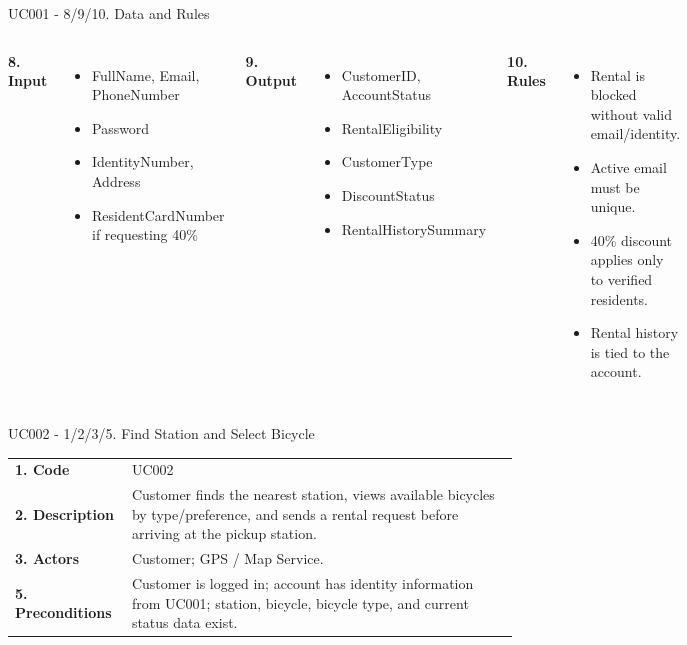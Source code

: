 \documentclass[aspectratio=169,10pt]{beamer}
\newcommand{\tightitems}{\setlength{\itemsep}{2pt}\setlength{\parskip}{0pt}}
\begin{document}
\begin{frame}{UC001 - 8/9/10. Data and Rules}
\footnotesize
\begin{columns}[T,onlytextwidth]
\textbf{8. Input}
\begin{itemize}\tightitems
  \item FullName, Email, PhoneNumber
  \item Password
  \item IdentityNumber, Address
  \item ResidentCardNumber if requesting 40\%
\end{itemize}
\textbf{9. Output}
\begin{itemize}\tightitems
  \item CustomerID, AccountStatus
  \item RentalEligibility
  \item CustomerType
  \item DiscountStatus
  \item RentalHistorySummary
\end{itemize}
\textbf{10. Rules}
\begin{itemize}\tightitems
  \item Rental is blocked without valid email/identity.
  \item Active email must be unique.
  \item 40\% discount applies only to verified residents.
  \item Rental history is tied to the account.
\end{itemize}
\end{columns}
\end{frame}

\begin{frame}{UC002 - 1/2/3/5. Find Station and Select Bicycle}
\small
\begin{tabular}{p{}p{}}
\toprule
\textbf{1. Code} & UC002 \\
\textbf{2. Description} & Customer finds the nearest station, views available bicycles by type/preference, and sends a rental request before arriving at the pickup station. \\
\textbf{3. Actors} & Customer; GPS / Map Service. \\
\textbf{5. Preconditions} & Customer is logged in; account has identity information from UC001; station, bicycle, bicycle type, and current status data exist. \\
\bottomrule
\end{tabular}
\end{frame}
\end{document}

